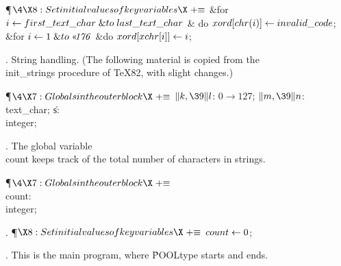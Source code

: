 \Y\P$\4\X8:Set initial values of key variables\X\mathrel{+}\S$\6
\&{for} $\hbox{$i$}\gets\\{first\_text\_char}\mathrel{\&{to}}\\{last\_text\_char}$ \1\&
{do}\5
$\\{xord}[\\{chr}(\hbox{$i$})]\gets\\{invalid\_code}$;\2\6
\&{for} $\|i\K1\mathrel{\&{to}}\O{176}$ \1\&{do}\5
$\\{xord}[\\{xchr}[\hbox{$i$}]]\gets\hbox{$i$}$;\2\par
\fi
{}.  String handling.
(The following material is copied from the \\{init\_strings} procedure of
\TeX82, with slight changes.)

\Y\P$\4\X7:Globals in the outer block\X\mathrel{+}\S$\6
\4$\|k,\39\|l$: $0\to127$;\6
\4$\|m,\39\|n$: \\{text\_char};\6
\4\|s: \\{integer};\par
\fi
{}. The global variable \\{count} keeps track of the total number of
characters
in strings.

\Y\P$\4\X7:Globals in the outer block\X\mathrel{+}\S$\6
\4\\{count}: \\{integer};\par
\fi
{}. \P$\X8:Set initial values of key variables\X\mathrel{+}\S$\6
$\\{count}\gets0$;\par
\fi
{}. This is the main program, where \.{POOLtype} starts and ends.

